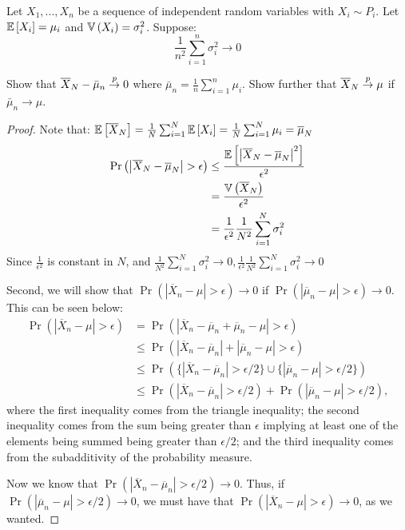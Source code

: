 \documentclass[12pt, letterpaper]{paper}
\begin{document}
\begin{question}
  Let $X_1, ..., X_n$ be a sequence of independent random variables
  with $X_i \sim P_i$. Let $\mathbb{E} \left [ X_i \right ] = \mu_i$ and $\mathbb{V} \left ( X_i \right ) =
  \sigma_i^2$. Suppose:
  \begin{equation*}
    \frac{1}{n^2} \sum_{i=1}^n \sigma_i^2 \to 0
  \end{equation*}

  Show that $\overline{ X }_{N} - \bar{\mu}_n \overset{p}{\to} 0$ where $\bar{\mu}_n =
  \frac{1}{n}\sum_{i=1}^n \mu_i$. Show further that $\overline{ X }_{N} \overset{p}{\to} \mu$ if
  $\bar{\mu}_n \to \mu$.

  \begin{proof}
    Note that: $\mathbb{E} \left [ \overline{ X }_{N} \right ] = \frac{1}{N}\sum_{i=1}^N \mathbb{E} \left [ X_i \right ] =
    \frac{1}{N} \sum_{i=1}^N \mu_i = \overline{ \mu }_{N}$
    \begin{align*}
      \Pr\left(\left \lvert \overline{ X }_{N} - \overline{ \mu }_{N} \right \rvert > \epsilon \right) &\leq \frac{\mathbb{E} \left [ 
              \left \lvert \overline{ X }_{N} - \overline{ \mu }_{N} \right \rvert^2 \right ]}{\epsilon^2}\\
      &= \frac{\mathbb{V} \left ( \overline{ X }_{N} \right )}{\epsilon^2}\\
      &= \frac{1}{\epsilon^2} \frac{1}{N^2} \sum_{i=1}^N \sigma_i^2\\
    \end{align*}
    Since $\frac{1}{\epsilon^2}$ is constant in $N$, and $\frac{1}{N^2}
    \sum_{i=1}^N \sigma_i^2 \to 0,  \frac{1}{\epsilon^2} \frac{1}{N^2} \sum_{i=1}^N \sigma_i^2
    \to 0$

    \vspace{.25in}

Second, we will show that $\Pr(|\overline{X}_n-\mu|>\epsilon)\to 0$ if $\Pr(|\overline{\mu}_n-\mu|>\epsilon)\to 0$. This can be seen below:
\begin{equation}
    \begin{split}
        \Pr(|\overline{X}_n-\mu|>\epsilon)&=\Pr(|\overline{X}_n-\overline{\mu}_n+\overline{\mu}_n-\mu|>\epsilon)\\
        &\le \Pr(|\overline{X}_n-\overline{\mu}_n| + |\overline{\mu}_n-\mu|>\epsilon)\\
        &\le \Pr(\{|\overline{X}_n-\overline{\mu}_n|>\epsilon/2\}\cup\{|\overline{\mu}_n-\mu|>\epsilon/2\})\\
        &\le \Pr(|\overline{X}_n-\overline{\mu}_n|>\epsilon/2)+\Pr(|\overline{\mu}_n-\mu|>\epsilon/2),
    \end{split}
\end{equation}
\noindent where the first inequality comes from the triangle
inequality; the second inequality comes from the sum being greater
than $\epsilon$ implying at least one of the elements being summed being
greater than $\epsilon/2$; and the third inequality comes from the
subadditivity of the probability measure.

Now we know that $\Pr(|\overline{X}_n-\overline{\mu}_n|>\epsilon/2)\to 0$. Thus, if $\Pr(|\overline{\mu}_n-\mu|>\epsilon/2)\to 0$, we must have that $\Pr(|\overline{X}_n-\mu|>\epsilon)\to 0$, as we wanted.


  \end{proof}
\end{question}
\end{document}

